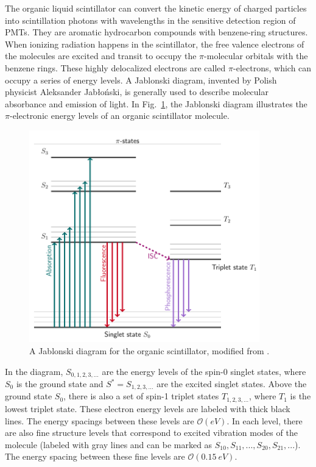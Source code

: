 The organic liquid scintillator can convert the kinetic energy of charged particles into scintillation photons with wavelengths in the sensitive detection region of PMTs. They are aromatic hydrocarbon compounds with benzene-ring structures. When ionizing radiation happens in the scintillator, the free valence electrons of the molecules are excited and transit to occupy the $\pi$-molecular orbitals with the benzene rings. These highly delocalized electrons are called $\pi$-electrons, which can occupy a series of energy levels. A Jablonski diagram, invented by Polish physicist Aleksander Jab\l o\'{n}ski, is generally used to describe molecular absorbance and emission of light. In Fig.~\ref{jablonski}, the Jablonski diagram illustrates the $\pi$-electronic energy levels of an organic scintillator molecule\cite{knoll2010radiation,leo2012techniques}. 
\begin{figure}[!htb]
	\centering
	\includegraphics[width=10cm]{jablonski.png}
	\caption{A Jablonski diagram for the organic scintillator, modified from \cite{birks1965theory, knoll2010radiation}.}
	\label{jablonski}
\end{figure}

In the diagram, $S_{0,1,2,3,...}$ are the energy levels of the spin-0 singlet states, where $S_0$ is the ground state and $S^*=S_{1,2,3,...}$ are the excited singlet states. Above the ground state $S_0$, there is also a set of spin-1 triplet states $T_{1,2,3,...}$, where $T_1$ is the lowest triplet state. These electron energy levels are labeled with thick black lines. The energy spacings between these levels are $\mathcal{O}(eV)$. In each level, there are also fine structure levels that correspond to excited vibration modes of the molecule (labeled with gray lines and can be marked as $S_{10}, S_{11}, ..., S_{20}, S_{21}, ...$). The energy spacing between these fine levels are $\mathcal{O}(0.15~eV)$\cite{leo2012techniques, knoll2010radiation}.

